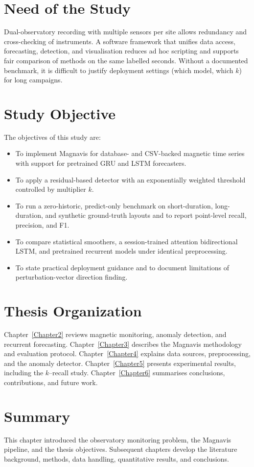 \section{Need of the Study}
Dual-observatory recording with multiple sensors per site allows redundancy and cross-checking of instruments. A software framework that unifies data access, forecasting, detection, and visualisation reduces ad hoc scripting and supports fair comparison of methods on the same labelled seconds. Without a documented benchmark, it is difficult to justify deployment settings (which model, which $k$) for long campaigns.

\section{Study Objective}
The objectives of this study are:
\begin{itemize}
    \item To implement Magnavis for database- and CSV-backed magnetic time series with support for pretrained GRU and LSTM forecasters.
    \item To apply a residual-based detector with an exponentially weighted threshold controlled by multiplier $k$.
    \item To run a zero-historic, predict-only benchmark on short-duration, long-duration, and synthetic ground-truth layouts and to report point-level recall, precision, and F1.
    \item To compare statistical smoothers, a session-trained attention bidirectional LSTM, and pretrained recurrent models under identical preprocessing.
    \item To state practical deployment guidance and to document limitations of perturbation-vector direction finding.
\end{itemize}

\section{Thesis Organization}
Chapter~\ref{Chapter2} reviews magnetic monitoring, anomaly detection, and recurrent forecasting. Chapter~\ref{Chapter3} describes the Magnavis methodology and evaluation protocol. Chapter~\ref{Chapter4} explains data sources, preprocessing, and the anomaly detector. Chapter~\ref{Chapter5} presents experimental results, including the $k$--recall study. Chapter~\ref{Chapter6} summarises conclusions, contributions, and future work.

\section{Summary}
This chapter introduced the observatory monitoring problem, the Magnavis pipeline, and the thesis objectives. Subsequent chapters develop the literature background, methods, data handling, quantitative results, and conclusions.
